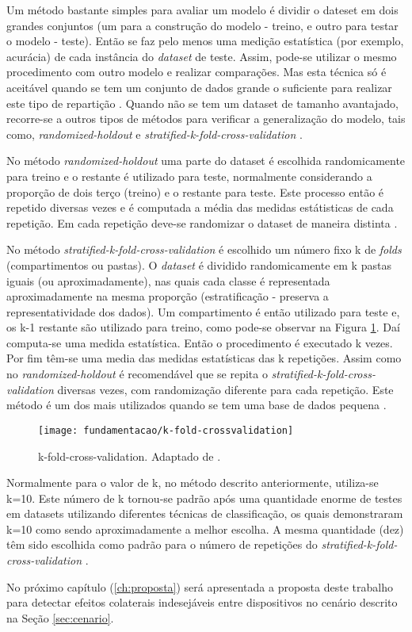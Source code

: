 Um método bastante simples para avaliar um modelo é dividir o dateset em dois grandes conjuntos (um para a construção do modelo - treino, e outro para testar o modelo - teste). Então se faz pelo menos uma medição estatística (por exemplo, acurácia) de cada instância do \textit{dataset} de teste. Assim, pode-se utilizar o mesmo procedimento com outro modelo e realizar comparações. Mas esta técnica só é aceitável quando se tem um conjunto de dados grande o suficiente para realizar este tipo de repartição \cite{Kotsiantis:2007}. Quando não se tem um dataset de tamanho avantajado, recorre-se a outros tipos de métodos para verificar a generalização do modelo, tais como, \textit{randomized-holdout} e \textit{stratified-k-fold-cross-validation} \cite{Witten:2005}.

No método \textit{randomized-holdout} uma parte do dataset é escolhida randomicamente para treino e o restante é utilizado para teste, normalmente considerando a proporção de dois terço (treino) e o restante para teste. Este processo então é repetido diversas vezes e é computada a média das medidas estátisticas de cada repetição. Em cada repetição deve-se randomizar o dataset de maneira distinta \cite{Witten:2005}.

No método \textit{stratified-k-fold-cross-validation} é escolhido um número fixo k de \textit{folds} (compartimentos ou pastas). O \textit{dataset} é dividido randomicamente em k pastas iguais (ou aproximadamente), nas quais cada classe é representada aproximadamente na mesma proporção (estratificação - preserva a representatividade dos dados). 
Um compartimento é então utilizado para teste e, os k-1 restante são utilizado para treino, como pode-se observar na Figura \ref{fig:kfoldcrossvalidation}. Daí computa-se uma medida estatística. Então o procedimento é executado k vezes. Por fim têm-se uma media das medidas estatísticas das k repetições. Assim como no \textit{randomized-holdout} é recomendável que se repita o \textit{stratified-k-fold-cross-validation} diversas vezes, com randomização diferente para cada repetição. Este método é um dos mais utilizados quando se tem uma base de dados pequena \cite{Witten:2005}.

\begin{figure}[!htb] \centering 
  \centering
  \texttt{[image: fundamentacao/k-fold-crossvalidation]} 
  \caption{k-fold-cross-validation. Adaptado de \cite{Olson:2008}.} 
  \label{fig:kfoldcrossvalidation}
\end{figure}

Normalmente para o valor de k, no método descrito anteriormente, utiliza-se k=10. Este número de k tornou-se padrão após uma quantidade enorme de testes em datasets utilizando diferentes técnicas de classificação, os quais demonstraram k=10 como sendo aproximadamente a melhor escolha. A mesma quantidade (dez) têm sido escolhida como padrão para o número de repetições do \textit{stratified-k-fold-cross-validation} \cite{Witten:2005}.

No próximo capítulo (\ref{ch:proposta}) será apresentada a proposta deste trabalho para detectar efeitos colaterais indesejáveis entre dispositivos no cenário descrito na Seção \ref{sec:cenario}.
